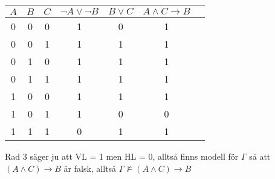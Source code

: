 \begin{center}
  \begin{tabular}{|c|c|c|c|c|c|c|}
    \hline
    $A$&$B$&$C$&$\neg A\vee\neg B$&$B\vee C$&$A\wedge C\rightarrow B$\\
    \hline
    0&0&0&1&0&1\\
    \hline
    0&0&1&1&1&1\\
    \hline
    0&1&0&1&1&1\\
    \hline
    0&1&1&1&1&1\\
    \hline
    1&0&0&1&1&1\\
    \hline
    1&0&1&1&0&0\\
    \hline
    1&1&1&0&1&1\\
    \hline
  \end{tabular}
\end{center}
\par\bigskip
\noindent Rad 3 säger ju att VL = 1 men HL = 0, alltså finns modell för $\Gamma$ så att $(A\wedge C)\rightarrow B$ är falsk, alltså $\Gamma\nvDash(A\wedge C)\rightarrow B$







